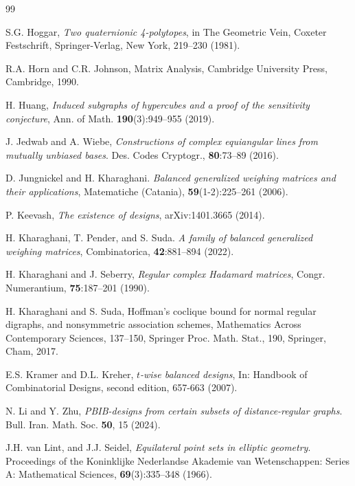 \documentclass[11pt]{article}
\begin{document}
\begin{thebibliography}{99}

S.G. Hoggar, 
\emph{Two quaternionic 4-polytopes}, in The Geometric Vein, Coxeter Festschrift, Springer-Verlag, New York, 219--230 (1981).

R.A. Horn and C.R. Johnson, Matrix Analysis,
{Cambridge University Press,} Cambridge, 1990.

 H. Huang, 
 \emph{Induced subgraphs of hypercubes and a proof of the sensitivity conjecture}, 
 Ann. of Math. \textbf{190}(3):949--955 (2019). 

 J. Jedwab and A. Wiebe, \textit{Constructions of complex equiangular lines from mutually unbiased bases}. Des. Codes Cryptogr., \textbf{80}:73--89 (2016).

D. Jungnickel and H. Kharaghani. \emph{Balanced generalized weighing matrices
and their applications}, Matematiche (Catania), \textbf{59}(1-2):225--261 (2006).

P. Keevash, \textit{The existence of designs}, arXiv:1401.3665 (2014).

H. Kharaghani, T. Pender, and S. Suda.
\emph{A family of balanced generalized weighing matrices}, Combinatorica, \textbf{42}:881--894 (2022).

 H. Kharaghani and  J. Seberry, 
 \emph{Regular complex Hadamard matrices}, 
 Congr. Numerantium, {\bf 75}:187--201 (1990).


H. Kharaghani and S. Suda, Hoffman’s coclique bound for normal regular digraphs,
and nonsymmetric association schemes, Mathematics Across Contemporary Sciences,
137–150, Springer Proc. Math. Stat., 190, Springer, Cham, 2017.

E.S. Kramer and  D.L. Kreher, \textit{$t$-wise balanced designs},  In: Handbook of Combinatorial Designs, second edition, 657-663 (2007). 

N. Li and  Y. Zhu,  \emph{PBIB-designs from certain subsets of distance-regular graphs}. Bull. Iran. Math. Soc. {\bf 50}, 15 (2024). 

J.H. van Lint, and J.J. Seidel, \textit{Equilateral point sets in elliptic geometry}. Proceedings of the Koninklijke Nederlandse Akademie van Wetenschappen: Series A: Mathematical Sciences, {\bf 69}(3):335--348 (1966).


\end{thebibliography}
\end{document}

